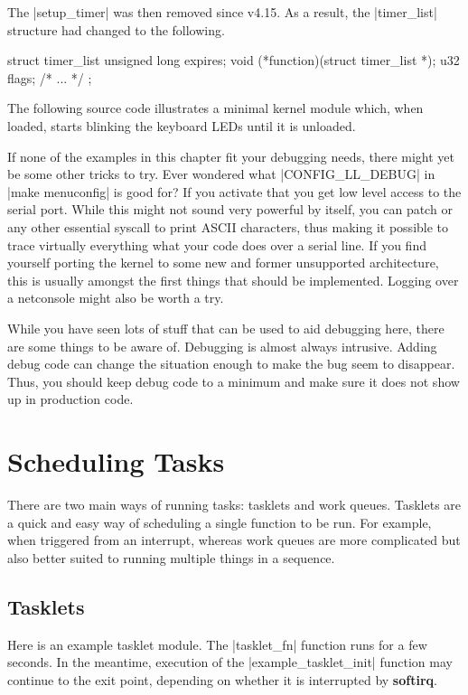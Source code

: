 \documentclass[10pt, oneside]{book}
\begin{document}
The \cpp|setup_timer| was then removed since v4.15.
As a result, the \cpp|timer_list| structure had changed to the following.
\begin{code}
struct timer_list {
    unsigned long expires;
    void (*function)(struct timer_list *);
    u32 flags;
    /* ... */
};
\end{code}

The following source code illustrates a minimal kernel module which, when loaded, starts blinking the keyboard LEDs until it is unloaded.


If none of the examples in this chapter fit your debugging needs, there might yet be some other tricks to try.
Ever wondered what \cpp|CONFIG_LL_DEBUG| in \sh|make menuconfig| is good for?
If you activate that you get low level access to the serial port.
While this might not sound very powerful by itself, you can patch  or any other essential syscall to print ASCII characters, thus making it possible to trace virtually everything what your code does over a serial line.
If you find yourself porting the kernel to some new and former unsupported architecture, this is usually amongst the first things that should be implemented.
Logging over a netconsole might also be worth a try.

While you have seen lots of stuff that can be used to aid debugging here, there are some things to be aware of. Debugging is almost always intrusive.
Adding debug code can change the situation enough to make the bug seem to disappear.
Thus, you should keep debug code to a minimum and make sure it does not show up in production code.

\section{Scheduling Tasks}
\label{sec:scheduling_tasks}
There are two main ways of running tasks: tasklets and work queues.
Tasklets are a quick and easy way of scheduling a single function to be run.
For example, when triggered from an interrupt, whereas work queues are more complicated but also better suited to running multiple things in a sequence.

\subsection{Tasklets}
\label{sec:tasklet}
Here is an example tasklet module.
The \cpp|tasklet_fn| function runs for a few seconds.
In the meantime, execution of the \cpp|example_tasklet_init| function may continue to the exit point, depending on whether it is interrupted by \textbf{softirq}.
\end{document}
